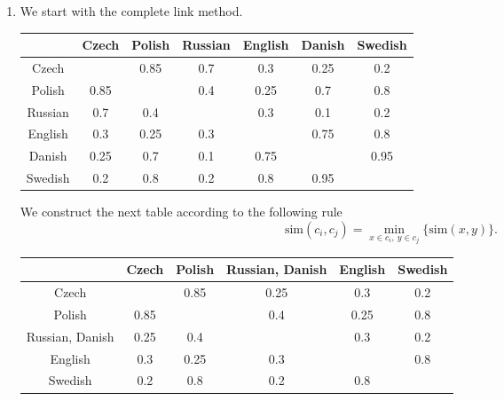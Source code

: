 \documentclass[fontsize=12pt, usenames, dvipsnames, headinclude, headsepline, footinclude, footsepline]{scrartcl}
\begin{document}
  \begin{sol}
    \begin{enumerate}
    \item We start with the complete link method.

      \begin{center}
        \begin{tabular}{@{}c|cccccc@{}}
          \toprule
          & Czech & Polish & Russian & English & Danish & Swedish \\ \midrule
          Czech   &       & 0.85   & 0.7     & 0.3     & 0.25   & 0.2     \\
          Polish  & 0.85  &        & 0.4     & 0.25    & 0.7    & 0.8     \\
          Russian & 0.7   & 0.4    &         & 0.3     & \cellcolor{ForestGreen!30}0.1    & 0.2     \\
          English & 0.3   & 0.25   & 0.3     &         & 0.75   & 0.8     \\
          Danish  & 0.25  & 0.7    & 0.1     & 0.75    &        & 0.95    \\
          Swedish & 0.2   & 0.8    & 0.2     & 0.8     & 0.95   &         \\ \bottomrule
        \end{tabular}
      \end{center}

      We construct the next table according to the following rule 
      \[ \mathrm{sim}(c_i, c_j) = \min_{x \in c_i,\ y \in c_j}\{\mathrm{sim}(x, y)\}. \]
      
      \begin{center}
        \begin{tabular}{@{}c|ccccc@{}}
          \toprule
          & Czech & Polish & Russian, Danish & English & Swedish \\ \midrule
          Czech           &       & 0.85   & 0.25            & 0.3     & 0.2     \\
          Polish          & 0.85  &        & 0.4             & 0.25    & 0.8     \\
          Russian, Danish & 0.25  & 0.4    &                 & 0.3     & \cellcolor{ForestGreen!30}0.2     \\
          English         & 0.3   & 0.25   & 0.3             &         & 0.8     \\
          Swedish         & 0.2   & 0.8    & 0.2             & 0.8     &         \\ \bottomrule
        \end{tabular}
      \end{center}
      

\end{enumerate}
\end{sol}
\end{document}
